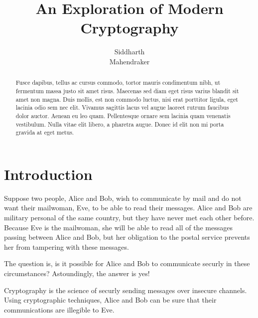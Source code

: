 \documentclass[12pt, a4paper, draft]{report}
\begin{document}
\title{An Exploration of Modern Cryptography}
\author{Siddharth\\
        Mahendraker}
\maketitle

\begin{abstract}
Fusce dapibus, tellus ac cursus commodo, tortor mauris condimentum nibh,
ut fermentum massa justo sit amet risus. Maecenas sed diam eget risus
varius blandit sit amet non magna. Duis mollis, est non commodo luctus,
nisi erat porttitor ligula, eget lacinia odio sem nec elit. Vivamus
sagittis lacus vel augue laoreet rutrum faucibus dolor auctor. Aenean
eu leo quam. Pellentesque ornare sem lacinia quam venenatis vestibulum.
Nulla vitae elit libero, a pharetra augue. Donec id elit non mi porta
gravida at eget metus.
\end{abstract}

\setcounter{secnumdepth}{3}
\renewcommand*\thesection{\arabic{section}}
\renewcommand{\cftsecfont}{\bfseries}

\setcounter{page}{1}
\tableofcontents
\clearpage
{}
\setcounter{page}{1}

\section*{Introduction}

Suppose two people, Alice and Bob, wish to communicate by mail and do not
want their mailwoman, Eve, to be able to read their messages. Alice and Bob
are military personal of the same country, but they have never met each
other before. Because Eve is the mailwoman, she will be able to read
all of the messages passing between Alice and Bob, but her obligation to
the postal service prevents her from tampering with these
messages\footnotemark.


The question is, is it possible for Alice and Bob to communicate securly
in these circumstances? Astoundingly, the answer is yes!

Cryptography is the science of securly sending messages over insecure
channels. Using cryptographic techniques, Alice and Bob can be sure that
their communications are illegible to Eve.
\end{document}
